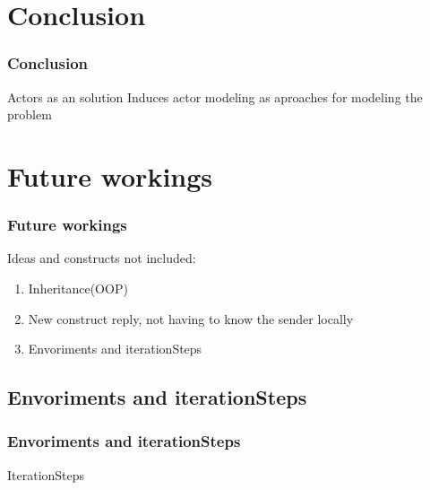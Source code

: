 \section{Conclusion}
\begin{frame}
	\frametitle{Conclusion}
	Actors as an solution
	  \indent Induces actor modeling as aproaches for modeling the problem
\end{frame}

\section{Future workings}
\begin{frame}
	\frametitle{Future workings}
	Ideas and constructs not included: 
  \begin{enumerate}
    \item Inheritance(OOP)
    \item New construct reply, not having to know the sender locally
    \item Envoriments and iterationSteps
  \end{enumerate}
\end{frame}

\subsection{Envoriments and iterationSteps}
\begin{frame}
	\frametitle{Envoriments and iterationSteps}
  IterationSteps
\end{frame}
